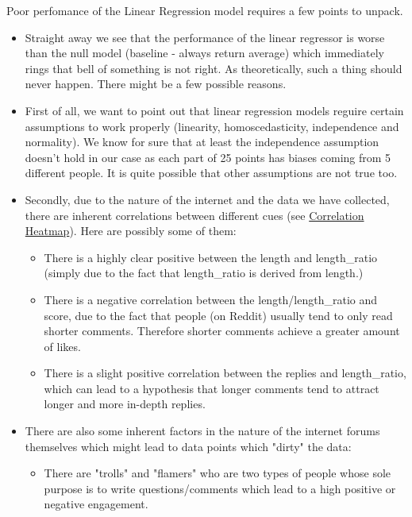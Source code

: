 \documentclass[11pt, oneside]{article}   	%
\begin{document}
Poor perfomance of the Linear Regression model requires a few points to unpack.
\begin{itemize}
    \item Straight away we see that the performance of the linear regressor is worse than the null model (baseline - always return average) which immediately rings that bell of something is not right. As theoretically, such a thing should never happen. There might be a few possible reasons.
    \item First of all, we want to point out that linear regression models reguire certain assumptions to work properly (linearity, homoscedasticity, independence and normality). We know for sure that at least the independence assumption doesn't hold in our case as each part of 25 points has biases coming from 5 different people. It is quite possible that other assumptions are not true too.
    \item Secondly, due to the nature of the internet and the data we have collected, there are inherent correlations between different cues (see \hyperref[fig:correlation_heatmap]{Correlation Heatmap}). Here are possibly some of them:
    \begin{itemize}
        \item There is a highly clear positive between the length and length\_ratio (simply due to the fact that length\_ratio is derived from length.)
        \item There is a negative correlation between the length/length\_ratio and score, due to the fact that people (on Reddit) usually tend to only read shorter comments. Therefore shorter comments achieve a greater amount of likes.
        \item There is a slight positive correlation between the replies and length\_ratio, which can lead to a hypothesis that longer comments tend to attract longer and more in-depth replies.
    \end{itemize}
    \item There are also some inherent factors in the nature of the internet forums themselves which might lead to data points which "dirty" the data:
    \begin{itemize}
        \item There are "trolls" and "flamers" who are two types of people whose sole purpose is to write questions/comments which lead to a high positive or negative engagement.
    \end{itemize}
\end{itemize}
\end{document}
